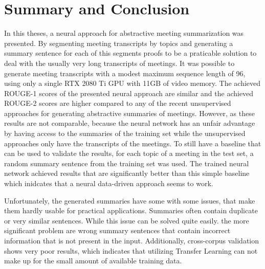 \chapter{Summary and Conclusion}\label{ch:summary-and-conclusion}

In this theses, a neural approach for abstractive meeting summarization was presented.
By segmenting meeting transcripts by topics and generating a summary sentence for each of this segments proofs to be a praticable solution to deal with the usually very long transcripts of meetings.
It was possible to generate meeting transcripts with a modest maximum sequence length of 96, using only a single RTX 2080 Ti GPU with 11GB of video memory.
The achieved ROUGE-1 scores of the presented neural approach are similar and the achieved ROUGE-2 scores are higher compared to any of the recent unsupervised approaches for generating abstractive summaries of meetings.
However, as these results are not comparable, because the neural network has an unfair advantage by having access to the summaries of the training set while the unsupervised approaches only have the transcripts of the meetings.
To still have a baseline that can be used to validate the results, for each topic of a meeting in the test set, a random summary sentence from the training set was used.
The trained neural network achieved results that are significantly better than this simple baseline which inidcates that a neural data-driven approach seems to work.

Unfortunately, the generated summaries have some with some issues, that make them hardly usable for practical applications.
Summaries often contain duplicate or very similar sentences.
While this issue can be solved quite easily. the more significant problem are wrong summary sentences that contain incorrect information that is not present in the input.
Additionally, cross-corpus validation shows very poor results, which indicates that utilizing Transfer Learning can not make up for the small amount of available training data.